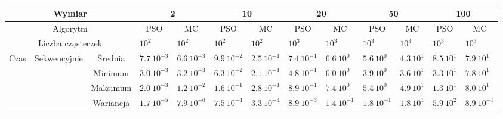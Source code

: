 \documentclass[11pt, a4paper, oneside]{article}
\begin{document}
\renewcommand{\arraystretch}{2}
\begin{table}[t]
\scriptsize
\begin{adjustwidth}{-1.76cm}{}
\centering
\begin{tabular}{|c|c|c|l|l|l|l|l|l|l|l|l|l|}
\hline
\multicolumn{3}{|c|}{Wymiar}                                      & \multicolumn{2}{c|}{2}                             & \multicolumn{2}{c|}{10}                            & \multicolumn{2}{c|}{20}                            & \multicolumn{2}{c|}{50}                            & \multicolumn{2}{c|}{100}                           \\ \hline
\multicolumn{3}{|c|}{Algorytm}                                    & \multicolumn{1}{c|}{PSO} & \multicolumn{1}{c|}{MC} & \multicolumn{1}{c|}{PSO} & \multicolumn{1}{c|}{MC} & \multicolumn{1}{c|}{PSO} & \multicolumn{1}{c|}{MC} & \multicolumn{1}{c|}{PSO} & \multicolumn{1}{c|}{MC} & \multicolumn{1}{c|}{PSO} & \multicolumn{1}{c|}{MC} \\ \hline
\multicolumn{3}{|c|}{Liczba cząsteczek}                           & $10^{2}$                 & $10^{2}$                & $10^{2}$                 & $10^{2}$                & $10^{3}$                 & $10^{3}$                & $10^{3}$                 & $10^{3}$                & $10^{3}$                 & $10^{3}$                \\ \hline
\multirow{8}{*}{Czas} & \multirow{4}{*}{Sekwencyjnie} & Średnia   & $7.7 \ 10^{-3}$          & $6.6 \ 10^{-3}$         & $9.9 \ 10^{-2}$          & $2.5 \ 10^{-1}$         & $7.4 \ 10^{-1}$          & $6.6 \ 10^{0}$          & $5.6 \ 10^{0}$           & $4.3 \ 10^{1}$          & $8.5 \ 10^{1}$           & $7.9 \ 10^{1}$          \\ \cline{3-13} 
                      &                               & Minimum   & $3.0 \ 10^{-3}$          & $3.2 \ 10^{-3}$         & $6.3 \ 10^{-2}$          & $2.1 \ 10^{-1}$         & $4.8 \ 10^{-1}$          & $6.0 \ 10^{0}$          & $3.9 \ 10^{0}$           & $3.6 \ 10^{1}$          & $3.3 \ 10^{1}$           & $7.8 \ 10^{1}$          \\ \cline{3-13} 
                      &                               & Maksimum  & $2.0 \ 10^{-3}$          & $1.2 \ 10^{-2}$         & $1.6 \ 10^{-1}$          & $2.8  \ 10^{-1}$        & $8.9 \ 10^{-1}$          & $7.4 \ 10^{0}$          & $5.4 \ 10^{0}$           & $4.9 \ 10^{1}$          & $1.3 \ 10^{1}$           & $8.0 \ 10^{1}$          \\ \cline{3-13} 
                      &                               & Wariancja & $1.7 \ 10^{-5}$          & $7.9 \ 10^{-6}$         & $7.5 \ 10^{-4}$          & $3.3 \ 10^{-4}$         & $8.9 \ 10^{-3}$          & $1.4 \ 10^{-1}$         & $1.8 \ 10^{-1}$          & $1.8 \ 10^{1}$          & $5.9 \ 10^{2}$           & $8.9 \ 10^{-1}$         \\ \cline{2-13} 

\end{tabular}
\end{adjustwidth}
\end{table}
\end{document}
